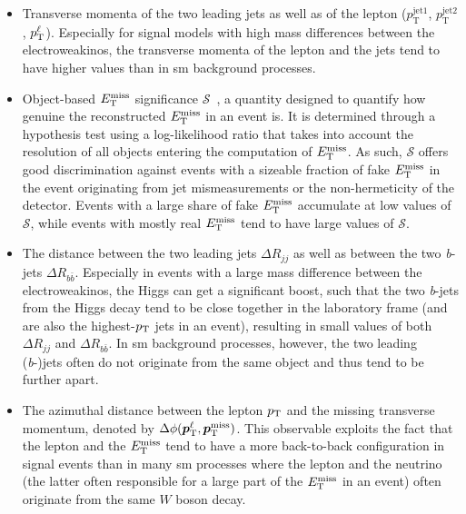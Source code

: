 \begin{itemize}
	\item Transverse momenta of the two leading jets as well as of the lepton ($p_\textrm{T}^\mathrm{jet1}$, $p_\textrm{T}^\mathrm{jet2}$, $p^\ell_{\textrm{T}}$). Especially for signal models with high mass differences between the electroweakinos, the transverse momenta of the lepton and the jets tend to have higher values than in \gls{sm} background processes.
	\item Object-based $E_{\textrm{T}}^{\textrm{miss}}$ significance $\mathcal{S}$~\cite{met_significance:2294922}, a quantity designed to quantify how genuine the reconstructed $E_{\textrm{T}}^{\textrm{miss}}$ in an event is. It is determined through a hypothesis test using a log-likelihood ratio that takes into account the resolution of all objects entering the computation of $E_{\textrm{T}}^{\textrm{miss}}$. As such, $\mathcal{S}$ offers good discrimination against events with a sizeable fraction of fake $E_{\textrm{T}}^{\textrm{miss}}$ in the event originating \eg from jet mismeasurements or the non-hermeticity of the detector. Events with a large share of fake $E_{\textrm{T}}^{\textrm{miss}}$ accumulate at low values of $\mathcal{S}$, while events with mostly real $E_{\textrm{T}}^{\textrm{miss}}$ tend to have large values of $\mathcal{S}$. 
	\item The distance between the two leading jets $\Delta R_{jj}$ as well as between the two \textit{b}-jets $\Delta R_{b\bar{b}}$. Especially in events with a large mass difference between the electroweakinos, the Higgs can get a significant boost, such that the two \textit{b}-jets from the Higgs decay tend to be close together in the laboratory frame (and are also the highest-$p_{\mathrm{T}}$ jets in an event), resulting in small values of both $\Delta R_{jj}$ and $\Delta R_{b\bar{b}}$. In \gls{sm} background processes, however, the two leading (\textit{b}-)jets often do not originate from the same object and thus tend to be further apart.
	\item The azimuthal distance between the lepton $p_{\mathrm{T}}$ and the missing transverse momentum, denoted by $\Delta \phi (\makemebold{p}_\mathrm{T}^\ell, \makemebold{p}_\mathrm{T}^\mathrm{miss})$. This observable exploits the fact that the lepton and the $E_{\textrm{T}}^{\textrm{miss}}$ tend to have a more back-to-back configuration in signal events than in many \gls{sm} processes where the lepton and the neutrino (the latter often responsible for a large part of the $E_{\textrm{T}}^{\textrm{miss}}$ in an event) often originate from the same $W$ boson decay.
\end{itemize}

